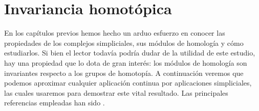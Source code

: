 
\chapter{Invariancia homotópica}

En los capítulos previos hemos hecho un arduo esfuerzo en conocer las propiedades de los complejos simpliciales, sus módulos de homología y cómo estudiarlos. Si bien el lector todavía podría dudar de la utilidad de este estudio, hay una propiedad que lo dota de gran interés: los módulos de homología son invariantes respecto a los grupos de homotopía. A continuación veremos que podemos aproximar cualquier aplicación continua por aplicaciones simpliciales, las cuales usaremos para demostrar este vital resultado. Las principales referencias empleadas han sido \cite{rafael2003elementos} \cite{Armstrong1983}.

